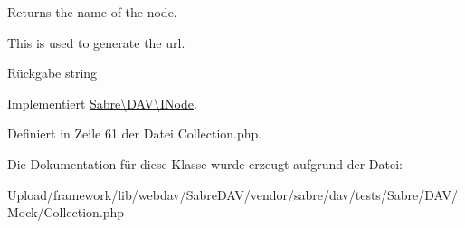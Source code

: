 Returns the name of the node.

This is used to generate the url.

\begin{DoxyReturn}{Rückgabe}
string 
\end{DoxyReturn}


Implementiert \mbox{\hyperlink{interface_sabre_1_1_d_a_v_1_1_i_node_ab616fe836b1ae36af12126a2bc934dce}{Sabre\textbackslash{}\+D\+A\+V\textbackslash{}\+I\+Node}}.



Definiert in Zeile 61 der Datei Collection.\+php.



Die Dokumentation für diese Klasse wurde erzeugt aufgrund der Datei\+:\begin{DoxyCompactItemize}
\item 
Upload/framework/lib/webdav/\+Sabre\+D\+A\+V/vendor/sabre/dav/tests/\+Sabre/\+D\+A\+V/\+Mock/Collection.\+php\end{DoxyCompactItemize}
